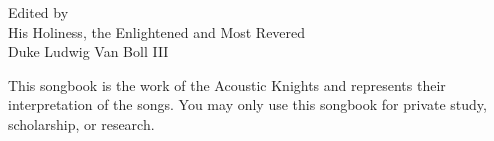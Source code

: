 \documentclass[11pt,a5paper,wordbk]{../SSSongbook}
\begin{document}
\let\cleardoublepage\clearpage %

{Edited by\\
  His Holiness, the Enlightened and Most Revered\\
Duke Ludwig Van Boll III}

\ifChordBk
\let\cleardoublepage\clearpage %
\fancyhead[R,L]{}
\tableofcontents %
\vfil
This songbook is the work of the Acoustic Knights
and represents their interpretation of the songs.
You may only use this songbook for private study,
scholarship, or research.\par
\pagebreak
\fi






\ifChordBk
\printindex
\fi
\end{document}
